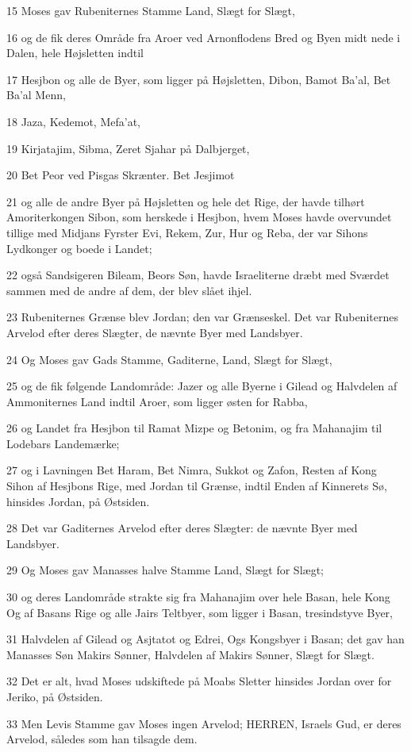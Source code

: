 \par 15 Moses gav Rubeniternes Stamme Land, Slægt for Slægt,
\par 16 og de fik deres Område fra Aroer ved Arnonflodens Bred og Byen midt nede i Dalen, hele Højsletten indtil
\par 17 Hesjbon og alle de Byer, som ligger på Højsletten, Dibon, Bamot Ba'al, Bet Ba'al Menn,
\par 18 Jaza, Kedemot, Mefa'at,
\par 19 Kirjatajim, Sibma, Zeret Sjahar på Dalbjerget,
\par 20 Bet Peor ved Pisgas Skrænter. Bet Jesjimot
\par 21 og alle de andre Byer på Højsletten og hele det Rige, der havde tilhørt Amoriterkongen Sibon, som herskede i Hesjbon, hvem Moses havde overvundet tillige med Midjans Fyrster Evi, Rekem, Zur, Hur og Reba, der var Sihons Lydkonger og boede i Landet;
\par 22 også Sandsigeren Bileam, Beors Søn, havde Israeliterne dræbt med Sværdet sammen med de andre af dem, der blev slået ihjel.
\par 23 Rubeniternes Grænse blev Jordan; den var Grænseskel. Det var Rubeniternes Arvelod efter deres Slægter, de nævnte Byer med Landsbyer.
\par 24 Og Moses gav Gads Stamme, Gaditerne, Land, Slægt for Slægt,
\par 25 og de fik følgende Landområde: Jazer og alle Byerne i Gilead og Halvdelen af Ammoniternes Land indtil Aroer, som ligger østen for Rabba,
\par 26 og Landet fra Hesjbon til Ramat Mizpe og Betonim, og fra Mahanajim til Lodebars Landemærke;
\par 27 og i Lavningen Bet Haram, Bet Nimra, Sukkot og Zafon, Resten af Kong Sihon af Hesjbons Rige, med Jordan til Grænse, indtil Enden af Kinnerets Sø, hinsides Jordan, på Østsiden.
\par 28 Det var Gaditernes Arvelod efter deres Slægter: de nævnte Byer med Landsbyer.
\par 29 Og Moses gav Manasses halve Stamme Land, Slægt for Slægt;
\par 30 og deres Landområde strakte sig fra Mahanajim over hele Basan, hele Kong Og af Basans Rige og alle Jairs Teltbyer, som ligger i Basan, tresindstyve Byer,
\par 31 Halvdelen af Gilead og Asjtatot og Edrei, Ogs Kongsbyer i Basan; det gav han Manasses Søn Makirs Sønner, Halvdelen af Makirs Sønner, Slægt for Slægt.
\par 32 Det er alt, hvad Moses udskiftede på Moabs Sletter hinsides Jordan over for Jeriko, på Østsiden.
\par 33 Men Levis Stamme gav Moses ingen Arvelod; HERREN, Israels Gud, er deres Arvelod, således som han tilsagde dem.

